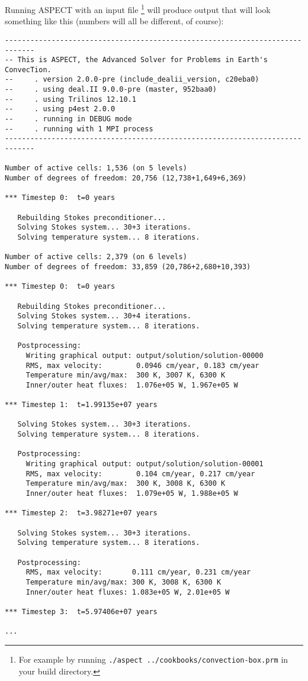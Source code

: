 \documentclass{article}
\newcommand{\aspect}{\textsc{ASPECT}}
\begin{document}
Running \aspect{} with an input file
\footnote{For example by running \texttt{./aspect ../cookbooks/convection-box.prm} in
your build directory.}
will produce output that will look
something like this (numbers will all be different, of course):
\begin{lstlisting}[frame=single,language=ksh]
-----------------------------------------------------------------------------
-- This is ASPECT, the Advanced Solver for Problems in Earth's ConvecTion.
--     . version 2.0.0-pre (include_dealii_version, c20eba0)
--     . using deal.II 9.0.0-pre (master, 952baa0)
--     . using Trilinos 12.10.1
--     . using p4est 2.0.0
--     . running in DEBUG mode
--     . running with 1 MPI process
-----------------------------------------------------------------------------

Number of active cells: 1,536 (on 5 levels)
Number of degrees of freedom: 20,756 (12,738+1,649+6,369)

*** Timestep 0:  t=0 years

   Rebuilding Stokes preconditioner...
   Solving Stokes system... 30+3 iterations.
   Solving temperature system... 8 iterations.

Number of active cells: 2,379 (on 6 levels)
Number of degrees of freedom: 33,859 (20,786+2,680+10,393)

*** Timestep 0:  t=0 years

   Rebuilding Stokes preconditioner...
   Solving Stokes system... 30+4 iterations.
   Solving temperature system... 8 iterations.

   Postprocessing:
     Writing graphical output: output/solution/solution-00000
     RMS, max velocity:        0.0946 cm/year, 0.183 cm/year
     Temperature min/avg/max:  300 K, 3007 K, 6300 K
     Inner/outer heat fluxes:  1.076e+05 W, 1.967e+05 W

*** Timestep 1:  t=1.99135e+07 years

   Solving Stokes system... 30+3 iterations.
   Solving temperature system... 8 iterations.

   Postprocessing:
     Writing graphical output: output/solution/solution-00001
     RMS, max velocity:        0.104 cm/year, 0.217 cm/year
     Temperature min/avg/max:  300 K, 3008 K, 6300 K
     Inner/outer heat fluxes:  1.079e+05 W, 1.988e+05 W

*** Timestep 2:  t=3.98271e+07 years

   Solving Stokes system... 30+3 iterations.
   Solving temperature system... 8 iterations.

   Postprocessing:
     RMS, max velocity:       0.111 cm/year, 0.231 cm/year
     Temperature min/avg/max: 300 K, 3008 K, 6300 K
     Inner/outer heat fluxes: 1.083e+05 W, 2.01e+05 W

*** Timestep 3:  t=5.97406e+07 years

...
\end{lstlisting}
\end{document}
